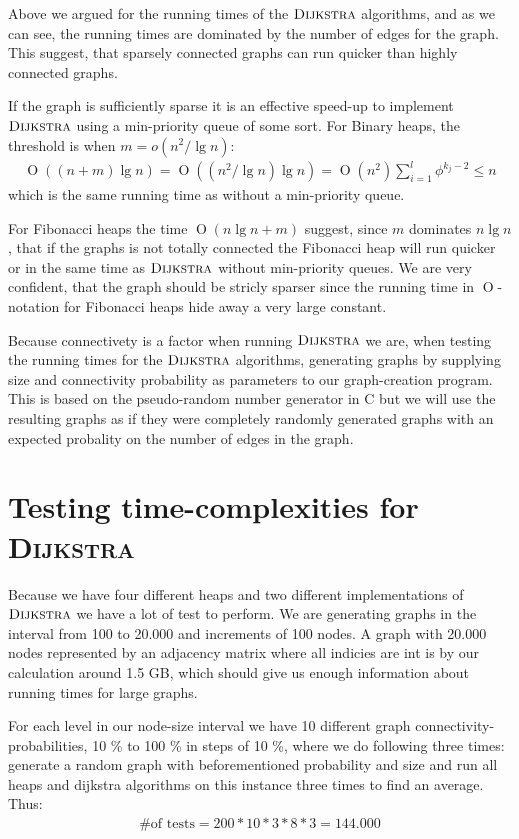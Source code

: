 \documentclass[oneside,11pt,openright]{report}
\newcommand{\BigO}[1]{\ensuremath{\operatorname{O}\left(#1\right)}}
\newcommand{\Dijkstra}{\textsc{Dijkstra}}
\begin{document}
Above we argued for the running times of the $\Dijkstra$ algorithms, and as we can see, the running times are dominated by the number of edges for the graph. This suggest, that sparsely connected graphs can run quicker than highly connected graphs.

If the graph is sufficiently sparse it is an effective speed-up to implement $\Dijkstra$ using a min-priority queue of some sort. For Binary heaps, the threshold is when $m = o(n^2 / \lg n)$:
\begin{align*}
    \BigO{(n+m)\lg n} = \BigO{(n^2/\lg n)\lg n} = \BigO{n^2}
\sum_{i=1}^l \phi^{k_j-2} \le n
 \end{align*}
 which is the same running time as without a min-priority queue.
 
For Fibonacci heaps the time $\BigO{n\lg n + m}$ suggest, since $m$ dominates $n \lg n$, that if the graphs is not totally connected the Fibonacci heap will run quicker or in the same time as $\Dijkstra$ without min-priority queues. We are very confident, that the graph should be stricly sparser since the running time in $\operatorname{O}$-notation for Fibonacci heaps hide away a very large constant.

Because connectivety is a factor when running $\Dijkstra$ we are, when testing the running times for the $\Dijkstra$ algorithms, generating graphs by supplying size and connectivity probability as parameters to our graph-creation program. This is based on the pseudo-random number generator in C but we will use the resulting graphs as if they were completely randomly generated graphs with an expected probality on the number of edges in the graph.

\section{Testing time-complexities for \Dijkstra}

Because we have four different heaps and two different implementations of $\Dijkstra$ we have a lot of test to perform. We are generating graphs in the interval from 100 to 20.000 and increments of 100 nodes. A graph with 20.000 nodes represented by an adjacency matrix where all indicies are int is by our calculation around 1.5 GB, which should give us enough information about running times for large graphs.

For each level in our node-size interval we have 10 different graph connectivity-probabilities, 10 \% to 100 \% in steps of 10 \%, where we do following three times: generate a random graph with beforementioned probability and size and run all heaps and dijkstra algorithms on this instance three times to find an average. Thus:
\begin{align*}
    \text{\# of tests} = 200 * 10 * 3 * 8 * 3 = 144.000 
 \end{align*}
\end{document}
